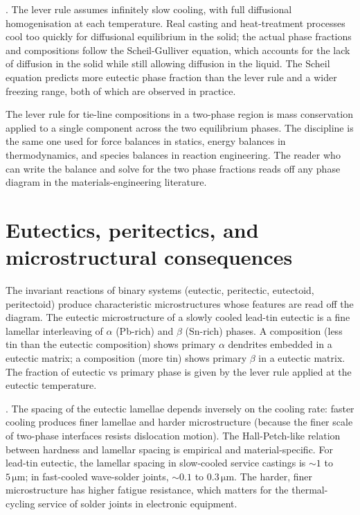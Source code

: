 . The lever rule assumes
infinitely slow cooling, with full diffusional homogenisation at each
temperature. Real casting and heat-treatment processes cool too
quickly for diffusional equilibrium in the solid; the actual phase
fractions and compositions follow the Scheil-Gulliver equation, which
accounts for the lack of diffusion in the solid while still allowing
diffusion in the liquid. The Scheil equation predicts more eutectic
phase fraction than the lever rule and a wider freezing range, both of
which are observed in practice.

\begin{principle}
The lever rule for tie-line compositions in a two-phase region is
mass conservation applied to a single component across the two
equilibrium phases. The discipline is the same one used for force
balances in statics, energy balances in thermodynamics, and species
balances in reaction engineering. The reader who can write the
balance and solve for the two phase fractions reads off any phase
diagram in the materials-engineering literature.
\end{principle}

\section{Eutectics, peritectics, and microstructural consequences}

The invariant reactions of binary systems (eutectic, peritectic,
eutectoid, peritectoid) produce characteristic microstructures whose
features are read off the diagram. The eutectic microstructure of a
slowly cooled lead-tin eutectic is a fine lamellar interleaving of
$\alpha$ (Pb-rich) and $\beta$ (Sn-rich) phases. A
 composition (less tin than the eutectic
composition) shows primary $\alpha$ dendrites embedded in a eutectic
matrix; a  composition (more tin) shows primary
$\beta$ in a eutectic matrix. The fraction of eutectic vs primary
phase is given by the lever rule applied at the eutectic temperature.

. The spacing of the
eutectic lamellae depends inversely on the cooling rate: faster
cooling produces finer lamellae and harder microstructure (because the
finer scale of two-phase interfaces resists dislocation motion). The
Hall-Petch-like relation between hardness and lamellar spacing is
empirical and material-specific. For lead-tin eutectic, the lamellar
spacing in slow-cooled service castings is $\sim 1$ to $5\,
\si{\micro\meter}$; in fast-cooled wave-solder joints, $\sim 0.1$ to
$0.3\,\si{\micro\meter}$. The harder, finer microstructure has
higher fatigue resistance, which matters for the thermal-cycling
service of solder joints in electronic equipment.

